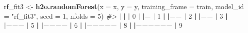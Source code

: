 \documentclass[]{book}
\newenvironment{Shaded}{\begin{snugshade}}{\end{snugshade}}
\newcommand{\CommentTok}[1]{\textcolor[rgb]{0.56,0.35,0.01}{\textit{#1}}}
\newcommand{\DataTypeTok}[1]{\textcolor[rgb]{0.13,0.29,0.53}{#1}}
\newcommand{\DecValTok}[1]{\textcolor[rgb]{0.00,0.00,0.81}{#1}}
\newcommand{\ErrorTok}[1]{\textcolor[rgb]{0.64,0.00,0.00}{\textbf{#1}}}
\newcommand{\KeywordTok}[1]{\textcolor[rgb]{0.13,0.29,0.53}{\textbf{#1}}}
\newcommand{\NormalTok}[1]{#1}
\newcommand{\OperatorTok}[1]{\textcolor[rgb]{0.81,0.36,0.00}{\textbf{#1}}}
\newcommand{\StringTok}[1]{\textcolor[rgb]{0.31,0.60,0.02}{#1}}
\begin{document}
\begin{Shaded}
\begin{Highlighting}[]
\NormalTok{rf_fit3 <-}\StringTok{ }\KeywordTok{h2o.randomForest}\NormalTok{(}\DataTypeTok{x =}\NormalTok{ x,}
                            \DataTypeTok{y =}\NormalTok{ y,}
                            \DataTypeTok{training_frame =}\NormalTok{ train,}
                            \DataTypeTok{model_id =} \StringTok{"rf_fit3"}\NormalTok{,}
                            \DataTypeTok{seed =} \DecValTok{1}\NormalTok{,}
                            \DataTypeTok{nfolds =} \DecValTok{5}\NormalTok{)}
\CommentTok{#> }
  \OperatorTok{|}\StringTok{                                                                       }
\StringTok{  }\ErrorTok{|}\StringTok{                                                                 }\ErrorTok{|}\StringTok{   }\DecValTok{0}\NormalTok{%}
  \OperatorTok{|}\StringTok{                                                                       }
\StringTok{  }\ErrorTok{|=}\StringTok{                                                                }\ErrorTok{|}\StringTok{   }\DecValTok{1}\NormalTok{%}
  \OperatorTok{|}\StringTok{                                                                       }
\StringTok{  }\ErrorTok{|==}\StringTok{                                                               }\ErrorTok{|}\StringTok{   }\DecValTok{2}\NormalTok{%}
  \OperatorTok{|}\StringTok{                                                                       }
\StringTok{  }\ErrorTok{|==}\StringTok{                                                               }\ErrorTok{|}\StringTok{   }\DecValTok{3}\NormalTok{%}
  \OperatorTok{|}\StringTok{                                                                       }
\StringTok{  }\ErrorTok{|===}\StringTok{                                                              }\ErrorTok{|}\StringTok{   }\DecValTok{5}\NormalTok{%}
  \OperatorTok{|}\StringTok{                                                                       }
\StringTok{  }\ErrorTok{|====}\StringTok{                                                             }\ErrorTok{|}\StringTok{   }\DecValTok{6}\NormalTok{%}
  \OperatorTok{|}\StringTok{                                                                       }
\StringTok{  }\ErrorTok{|=====}\StringTok{                                                            }\ErrorTok{|}\StringTok{   }\DecValTok{8}\NormalTok{%}
  \OperatorTok{|}\StringTok{                                                                       }
\StringTok{  }\ErrorTok{|======}\StringTok{                                                           }\ErrorTok{|}\StringTok{   }\DecValTok{9}\NormalTok{%}
}}}}}}}}
\end{Highlighting}
\end{Shaded}
\end{document}
